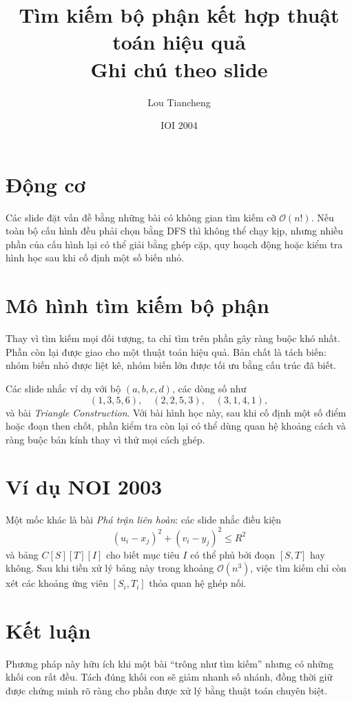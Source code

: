 \documentclass[11pt]{article}
\title{Tìm kiếm bộ phận kết hợp thuật toán hiệu quả\\{\large Ghi chú theo slide}}
\author{Lou Tiancheng}
\date{IOI 2004}
\newcommand{\Oh}{\mathcal{O}}
\begin{document}
\maketitle


\section{Động cơ}

Các slide đặt vấn đề bằng những bài có không gian tìm kiếm cỡ \(\Oh(n!)\).
Nếu toàn bộ cấu hình đều phải chọn bằng DFS thì không thể chạy kịp, nhưng
nhiều phần của cấu hình lại có thể giải bằng ghép cặp, quy hoạch động hoặc
kiểm tra hình học sau khi cố định một số biến nhỏ.

\section{Mô hình tìm kiếm bộ phận}

Thay vì tìm kiếm mọi đối tượng, ta chỉ tìm trên phần gây ràng buộc khó nhất.
Phần còn lại được giao cho một thuật toán hiệu quả. Bản chất là tách biến:
nhóm biến nhỏ được liệt kê, nhóm biến lớn được tối ưu bằng cấu trúc đã biết.

Các slide nhắc ví dụ với bộ \((a,b,c,d)\), các dòng số như
\[
  (1,3,5,6),\quad (2,2,5,3),\quad (3,1,4,1),
\]
và bài \emph{Triangle Construction}. Với bài hình học này, sau khi cố định
một số điểm hoặc đoạn then chốt, phần kiểm tra còn lại có thể dùng quan hệ
khoảng cách và ràng buộc bán kính thay vì thử mọi cách ghép.

\section{Ví dụ NOI 2003}

Một mốc khác là bài \emph{Phá trận liên hoàn}: các slide nhắc điều kiện
\[
  (u_i-x_j)^2+(v_i-y_j)^2\le R^2
\]
và bảng \(C[S][T][I]\) cho biết mục tiêu \(I\) có thể phủ bởi đoạn
\([S,T]\) hay không. Sau khi tiền xử lý bảng này trong khoảng \(\Oh(n^3)\),
việc tìm kiếm chỉ còn xét các khoảng ứng viên \([S_i,T_i]\) thỏa quan hệ
ghép nối.

\section{Kết luận}

Phương pháp này hữu ích khi một bài ``trông như tìm kiếm'' nhưng có những
khối con rất đều. Tách đúng khối con sẽ giảm nhanh số nhánh, đồng thời giữ
được chứng minh rõ ràng cho phần được xử lý bằng thuật toán chuyên biệt.
\end{document}
